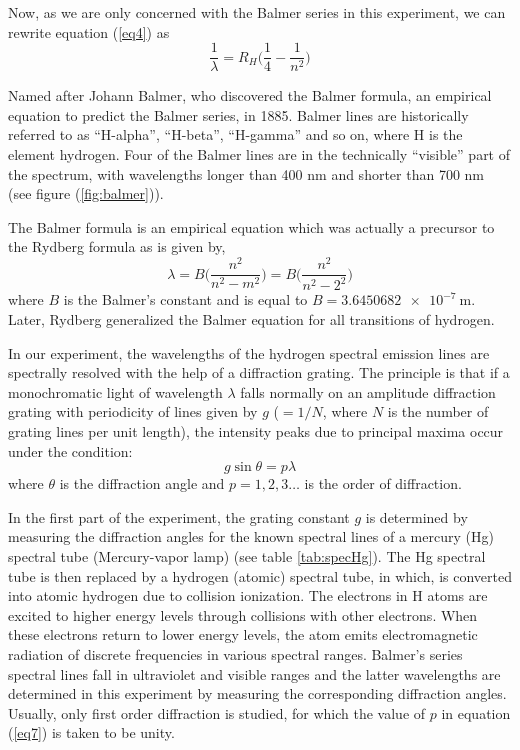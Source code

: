 \documentclass[%
 reprint,
 amsmath,amssymb,
 aps,
]{revtex4-2}
\begin{document}
    \par
    Now, as we are only concerned with the Balmer series in this experiment, we can rewrite equation (\ref{eq4}) as
    \begin{equation}
        \dfrac{1}{\lambda} = R_H \Bigg( \dfrac{1}{4} - \dfrac{1}{n^2} \Bigg)
    \end{equation}
    \par
    Named after Johann Balmer, who discovered the Balmer formula, an empirical equation to predict the Balmer series, in 1885. Balmer lines are historically referred to as ``H-alpha'', ``H-beta'', ``H-gamma'' and so on, where H is the element hydrogen. Four of the Balmer lines are in the technically ``visible'' part of the spectrum, with wavelengths longer than 400 nm and shorter than 700 nm (see figure (\ref{fig:balmer})).
    \par
    The Balmer formula is an empirical equation which was actually a precursor to the Rydberg formula as is given by,
    \begin{equation}
        \lambda = B \Bigg( \dfrac{n^2}{n^2 - m^2} \Bigg) = B  \Bigg( \dfrac{n^2}{n^2 - 2^2} \Bigg)
    \end{equation}
    where $B$ is the Balmer's constant and is equal to $B = \SI{3.6450682e-7}{\metre}$. Later, Rydberg generalized the Balmer equation for all transitions of hydrogen.
    \par
    In our experiment, the wavelengths of the hydrogen spectral emission lines are spectrally resolved with the help of a diffraction grating. The principle is that if a monochromatic light of wavelength $\lambda$ falls normally on an amplitude diffraction grating with periodicity of lines given by $g$ ($= 1/N$, where $N$ is the number of grating lines per unit length), the intensity peaks due to principal maxima occur under the condition:
    \begin{equation}
    \label{eq7}
        g \sin \theta = p \lambda
    \end{equation}
    where $\theta$ is the diffraction angle and $p = 1, 2, 3 \ldots$ is the order of diffraction. 
    \par
    In the first part of the experiment, the grating constant $g$ is determined by measuring the diffraction angles for the known spectral lines of a mercury (Hg) spectral tube (Mercury-vapor lamp) (see table \ref{tab:specHg}). The Hg spectral tube is then replaced by a hydrogen (atomic) spectral tube, in which,  is converted into atomic hydrogen due to collision ionization. The electrons in H atoms are excited to higher energy levels through collisions with other electrons. When these electrons return to lower energy levels, the atom emits electromagnetic radiation of discrete frequencies in various spectral ranges. Balmer's series spectral lines fall in ultraviolet and visible ranges and the latter wavelengths are determined in this experiment by measuring the corresponding diffraction angles. Usually, only first order diffraction is studied, for which the value of $p$ in equation (\ref{eq7}) is taken to be unity.
\end{document}
